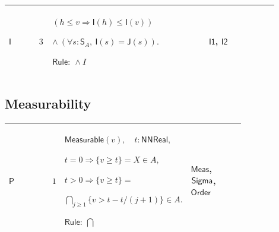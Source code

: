 \documentclass[12pt,reqno]{amsart}
\theoremstyle{blueplain}
\numberwithin{equation}{section}
\newlength{\FATOUOneColumnBody}
\begin{document}
{\scriptsize \setlength{\parskip}{0pt}\nointerlineskip
\noindent 
\begin{tabular}{|@{}>{\centering\arraybackslash}m{0.10658\linewidth}|>{\centering\arraybackslash}m{0.03553\linewidth}|>{\centering\arraybackslash}m{0.52105\linewidth}|>{\centering\arraybackslash}m{0.23684\linewidth}|}
\hline
\hypertarget{proof:I3}{$\displaystyle \mathsf{I}$} & $\displaystyle 3$ & $%
\displaystyle (h\le v\Rightarrow\mathsf{I}(h)\le\mathsf{I}(v))$\par$%
\displaystyle \land\ (\forall s:\mathsf{S}_A,\ \mathsf{I}(s)=\mathsf{J}(s)).$%
\par$\displaystyle \mathsf{Rule}:\ \land I$ & \hyperlink{proof:I1}{$%
\displaystyle \mathsf{I1}$}, \hyperlink{proof:I2}{$\displaystyle \mathsf{I2}$%
} \\ \hline
\end{tabular}%
}

\subsection{\protect\scriptsize Measurability}

{\scriptsize \setlength{\parskip}{0pt}\nointerlineskip
\noindent 
\begin{tabular}{|@{}>{\centering\arraybackslash}m{\FATOUOneColumnBody}|}
\hline
$\displaystyle \mathsf{Context\_P}:=$\par$\displaystyle h:\mathsf{PosNat}\to%
\mathsf{F},$\par$\displaystyle \forall n:\mathsf{PosNat},\ \mathsf{Measurable%
}(h_n).$ \\ \hline
\end{tabular}%
}

{\scriptsize \setlength{\parskip}{0pt}\nointerlineskip
\noindent 
\begin{tabular}{|@{}>{\centering\arraybackslash}m{0.10658\linewidth}|>{\centering\arraybackslash}m{0.03553\linewidth}|>{\centering\arraybackslash}m{0.52105\linewidth}|>{\centering\arraybackslash}m{0.23684\linewidth}|}
\hline
\hypertarget{proof:P1}{$\displaystyle \mathsf{P}$} & $\displaystyle 1$ & $%
\displaystyle \mathsf{Measurable}(v),\quad t:\mathsf{NNReal},$\par$%
\displaystyle t=0\Rightarrow\{v\ge t\}=X\in A,$\par$\displaystyle %
t>0\Rightarrow\{v\ge t\}=$\par$\displaystyle \bigcap_{j\ge1}\{v>t-t/(j+1)\}%
\in A.$\par$\displaystyle \mathsf{Rule}:\ \bigcap$ & \hyperlink{def:Meas}{$%
\displaystyle \mathsf{Meas}$}, \hyperlink{ax:Sigma}{$\displaystyle \mathsf{%
Sigma}$}, \hyperlink{ax:Order}{$\displaystyle \mathsf{Order}$} \\ \hline
\end{tabular}%
}
\end{document}
